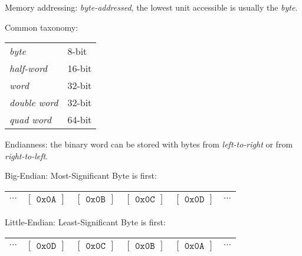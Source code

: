 \documentclass{article}
\begin{document}
Memory addressing: \textit{byte-addressed}, the lowest unit accessible is usually the \textit{byte}.

Common taxonomy:
\begin{tabular}{ll}
\textit{byte} & 8-bit\\
\textit{half-word} & 16-bit\\
\textit{word} & 32-bit\\
\textit{double word} & 32-bit\\
\textit{quad word} & 64-bit\\
\end{tabular}

Endianness: the binary word can be stored with bytes from \textit{left-to-right} or from \textit{right-to-left}.

\bigskip
Big-Endian: Most-Significant Byte is first:

\bigskip
\begin{tabular}{c|cccc|c}
\hline
$\cdots$ & $\begin{bmatrix}\texttt{0x0A}\end{bmatrix}$ 
         & $\begin{bmatrix}\texttt{0x0B}\end{bmatrix}$ 
         & $\begin{bmatrix}\texttt{0x0C}\end{bmatrix}$ 
         & $\begin{bmatrix}\texttt{0x0D}\end{bmatrix}$ & $\cdots$ \\
\hline
\end{tabular}

\bigskip
Little-Endian: Least-Significant Byte is first:

\bigskip
\begin{tabular}{c|cccc|c}
\hline
$\cdots$ & $\begin{bmatrix}\texttt{0x0D}\end{bmatrix}$ 
         & $\begin{bmatrix}\texttt{0x0C}\end{bmatrix}$ 
         & $\begin{bmatrix}\texttt{0x0B}\end{bmatrix}$ 
         & $\begin{bmatrix}\texttt{0x0A}\end{bmatrix}$ & $\cdots$ \\
\hline
\end{tabular}
\end{document}
